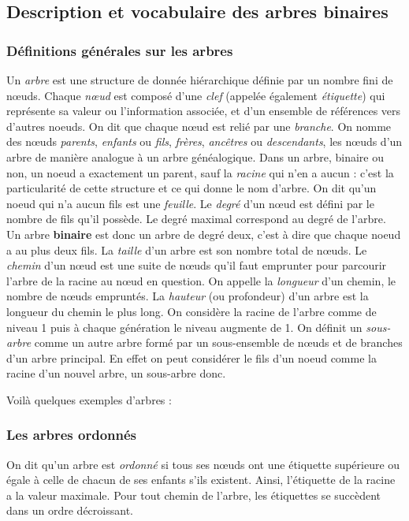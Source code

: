 \documentclass{report}
\begin{document}
\subsection{Description et vocabulaire des arbres binaires}
\subsubsection{Définitions générales sur les arbres}

Un \textit{arbre} est une structure de donnée hiérarchique définie par un nombre fini de nœuds. Chaque \textit{nœud} est composé d'une \textit{clef} (appelée également \textit{étiquette}) qui représente sa valeur ou l'information associée, et d'un ensemble de références vers d'autres noeuds. On dit que chaque nœud est relié par une \textit{branche}. 
On nomme des nœuds \textit{parents}, \textit{enfants} ou \textit{fils}, \textit{frères}, \textit{ancêtres} ou \textit{descendants}, les nœuds d'un arbre de manière analogue à un arbre généalogique. Dans un arbre, binaire ou non, un noeud a exactement un parent, sauf la \textit{racine} qui n'en a aucun : c'est la particularité de cette structure et ce qui donne le nom d'arbre. 
On dit qu'un noeud qui n'a aucun fils est une \textit{feuille}.
Le \textit{degré} d'un nœud est défini par le nombre de fils qu'il possède. Le degré maximal correspond au degré de l'arbre.
Un arbre \textbf{binaire} est donc un arbre de degré deux, c'est à dire que chaque noeud a au plus deux fils.
La \textit{taille} d'un arbre est son nombre total de nœuds.
Le \textit{chemin} d'un nœud est une suite de nœuds qu'il faut emprunter pour parcourir l'arbre de la racine au nœud en question. On appelle la \textit{longueur} d'un chemin, le nombre de nœuds empruntés.
La \textit{hauteur} (ou profondeur) d'un arbre est la longueur du chemin le plus long.
On considère la racine de l'arbre comme de niveau 1 puis à chaque génération le niveau augmente de 1.
On définit un \textit{sous-arbre} comme un autre arbre formé par un sous-ensemble de nœuds et de branches d'un arbre principal. En effet on peut considérer le fils d'un noeud comme la racine d'un nouvel arbre, un sous-arbre donc. 

Voilà quelques exemples d'arbres :

\subsubsection{Les arbres ordonnés}

On dit qu'un arbre est \textit{ordonné} si tous ses nœuds ont une étiquette supérieure ou égale à celle de chacun de ses enfants s'ils existent. Ainsi, l'étiquette de la racine a la valeur maximale. Pour tout chemin de l'arbre, les étiquettes se succèdent dans un ordre décroissant.
\end{document}
